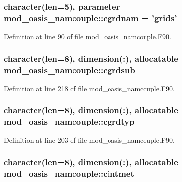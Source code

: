\hypertarget{classmod__oasis__namcouple_afaa0549951c43335a2f8e75c7b1d2846}{
\subsubsection[{cgrdnam}]{\setlength{\rightskip}{0pt plus 5cm}character(len=5), parameter mod\+\_\+oasis\+\_\+namcouple\+::cgrdnam = 'grids'\hspace{0.3cm}{\ttfamily [private]}}}\label{classmod__oasis__namcouple_afaa0549951c43335a2f8e75c7b1d2846}


Definition at line 90 of file mod\+\_\+oasis\+\_\+namcouple.\+F90.

\hypertarget{classmod__oasis__namcouple_ac7f3cff3406912fe6e48c3cc7cf5436b}{
\subsubsection[{cgrdsub}]{\setlength{\rightskip}{0pt plus 5cm}character(len=8), dimension(\+:), allocatable mod\+\_\+oasis\+\_\+namcouple\+::cgrdsub\hspace{0.3cm}{\ttfamily [private]}}}\label{classmod__oasis__namcouple_ac7f3cff3406912fe6e48c3cc7cf5436b}


Definition at line 218 of file mod\+\_\+oasis\+\_\+namcouple.\+F90.

\hypertarget{classmod__oasis__namcouple_a795db0909c85ffadb601b744b5189ff5}{
\subsubsection[{cgrdtyp}]{\setlength{\rightskip}{0pt plus 5cm}character(len=8), dimension(\+:), allocatable mod\+\_\+oasis\+\_\+namcouple\+::cgrdtyp\hspace{0.3cm}{\ttfamily [private]}}}\label{classmod__oasis__namcouple_a795db0909c85ffadb601b744b5189ff5}


Definition at line 203 of file mod\+\_\+oasis\+\_\+namcouple.\+F90.

\hypertarget{classmod__oasis__namcouple_ac9b9bb442cf77881bef2157c85e23495}{
\subsubsection[{cintmet}]{\setlength{\rightskip}{0pt plus 5cm}character(len=8), dimension(\+:), allocatable mod\+\_\+oasis\+\_\+namcouple\+::cintmet\hspace{0.3cm}{\ttfamily [private]}}}\label{classmod__oasis__namcouple_ac9b9bb442cf77881bef2157c85e23495}


